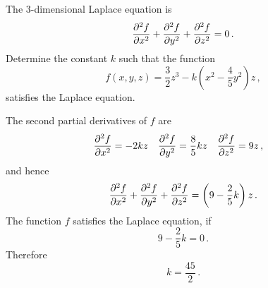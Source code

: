 \begin{question}
The 3-dimensional Laplace equation is
\[ \frac{\partial^2 f}{\partial x^2} + \frac{\partial^2 f}{\partial y^2} + \frac{\partial^2 f}{\partial z^2}=0\,. \]
Determine the constant $k$ such that the function
\[ f(x,y,z) = \frac 32 z^3 -k\left(x^2 -\frac 45 y^2 \right) z\,, \]
satisfies the Laplace equation.
\end{question}

\begin{solution}
The second partial derivatives of $f$ are
\begin{align*}
\frac{\partial^2 f}{\partial x^2} &= -2kz &
\frac{\partial^2 f}{\partial y^2} &= \frac 85 kz &
\frac{\partial^2 f}{\partial z^2} &= 9z\,,
\end{align*}
and hence
\[ \frac{\partial^2 f}{\partial x^2} + \frac{\partial^2 f}{\partial y^2} + \frac{\partial^2 f}{\partial z^2} =
\left(9 - \frac 25 k \right) z \,. \]
The function $f$ satisfies the Laplace equation, if
\[ 9 - \frac 25 k = 0\,. \]
Therefore
\[ k = \frac {45}2\,. \]
\end{solution}

